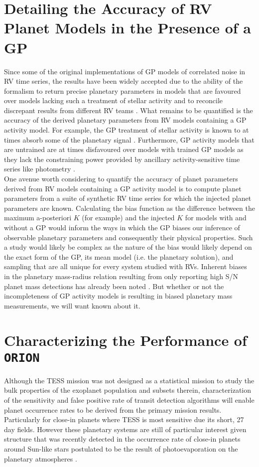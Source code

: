 \section{Detailing the Accuracy of RV Planet Models in the Presence of a GP}
Since some of the original implementations of GP models of correlated noise in
RV time series, the results have been widely accepted due to the ability of the
formalism to return precise planetary parameters in models that are favoured
over models lacking such a treatment of stellar activity
\citep{haywood14,rajpaul15} and to reconcile discrepant results from different
RV teams \citep{rajpaul17,cloutier19a}. What remains to be quantified is the accuracy of
the derived planetary parameters from RV models containing a GP activity model. For
example, the GP treatment of stellar activity is known to at times absorb some
of the planetary signal \citep[e.g.][]{ribas18}. Furthermore, GP activity models
that are untrained are at times disfavoured over models with trained GP models
as they lack the
constraining power provided by ancillary activity-sensitive time series like
photometry \citep{cloutier17b}. \\

One avenue worth considering to quantify the accuracy of planet parameters
derived from
RV models containing a GP activity model is to compute planet parameters
from a suite of synthetic RV time series for which the injected planet
parameters are known. Calculating the bias function as the difference between
the maximum a-posteriori $K$ (for example) and the injected $K$ for models with
and without a GP would inform the ways in which the GP biases our inference of
observable planetary parameters and consequently their physical properties.
Such a study would likely be complex as the nature of the bias would likely depend
on the exact form of the GP, its mean model (i.e. the planetary solution), and
sampling that are all unique for every system studied with RVs.
Inherent biases in the planetary mass-radius relation resulting from only
reporting high S/N planet mass detections has already been noted \citep{burt18}.
But whether or not the incompleteness of GP activity models is resulting in biased
planetary mass measurements, we will want known about it.


\section{Characterizing the Performance of \texttt{ORION}}
Although the TESS mission was not designed as a statistical mission to study
the bulk properties of the exoplanet population and subsets therein,
characterization of the sensitivity and false positive rate of transit detection
algorithms will enable planet occurrence rates to be derived from the primary
mission results. Particularly
for close-in planets where TESS is most sensitive due its short, 27 day fields.
However these planetary systems are still of particular interest given structure
that was recently detected in the occurrence rate of close-in planets around
Sun-like stars postulated to be the result of photoevaporation on the planetary
atmospheres \cite{owen13,fulton17,vaneylen18}. \\

